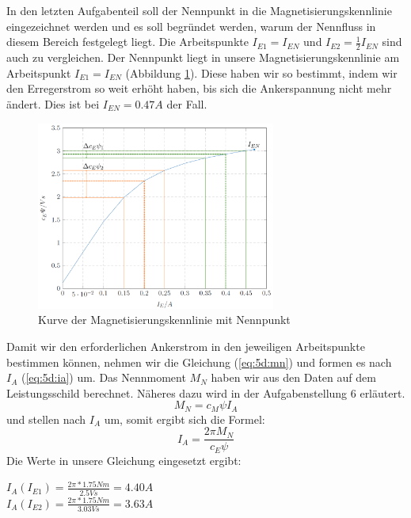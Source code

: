 \section{}
In den letzten Aufgabenteil soll der Nennpunkt in die Magnetisierungskennlinie eingezeichnet werden und es soll begründet werden, warum der Nennfluss in diesem Bereich festgelegt liegt. Die Arbeitspunkte $ I_{E1} = I_{EN} $ und $ I_{E2} = \frac{1}{2} I_{EN} $ sind auch zu vergleichen.
Der Nennpunkt liegt in unsere Magnetisierungskennlinie am Arbeitspunkt $ I_{E1} = I_{EN} $ (Abbildung \ref{fig:5d:kennlineNenn}). Diese haben wir so bestimmt, indem wir den Erregerstrom so weit erhöht haben, bis sich die Ankerspannung nicht mehr ändert. Dies ist bei $ I_{EN} = 0.47A $ der Fall.
\begin{figure}[h]
	\centering
	\includegraphics[width=0.7\textwidth]{./bilder/aufgabe4.png}
	\caption{Kurve der Magnetisierungskennlinie mit Nennpunkt}
	\label{fig:5d:kennlineNenn}
\end{figure}

Damit wir den erforderlichen Ankerstrom in den jeweiligen Arbeitspunkte bestimmen können, nehmen wir die Gleichung (\ref{eq:5d:mn}) und formen es nach $ I_{A} $ (\ref{eq:5d:ia}) um. Das Nennmoment $ M_{N} $ haben wir aus den Daten auf dem Leistungsschild berechnet. Näheres dazu wird in der Aufgabenstellung 6 erläutert.
\begin{equation}
	M_{N} = c_{M}\psi I_{A}
	\label{eq:5d:mn}
\end{equation} und stellen nach $ I_{A} $ um, somit ergibt sich die Formel:
\begin{equation}
	I_{A} = \frac{2\pi M_{N}}{c_{E}\psi}
	\label{eq:5d:ia}
\end{equation}
Die Werte in unsere Gleichung eingesetzt ergibt:
\begin{center}
	$ I_{A}(I_{E1}) = \frac{2\pi *1.75Nm}{2.5Vs} = 4.40A $ \\
	$ I_{A}(I_{E2}) = \frac{2\pi *1.75Nm}{3.03Vs} = 3.63A $
\end{center}

